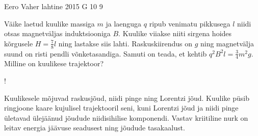 {Eero Vaher} %
{lahtine} %
{2015} %
{G 10} %
{9} %
{
\ifStatement
Väike laetud kuulike massiga $m$ ja laenguga $q$ ripub venimatu pikkusega $l$ niidi otsas magnetväljas induktsiooniga $B$. Kuulike viiakse niiti sirgena hoides kõrgusele $H=\frac{7}{8}l$ ning lastakse siis lahti. Raskuskiirendus on $g$ ning magnetvälja suund on risti pendli võnketasandiga. Samuti on teada, et kehtib $q^2B^2l=\frac{3}{4}m^2g$. Milline on kuulikese trajektoor?

\begin{center}
\begin{resizebox}{0.5\linewidth}{!}{
}
\end{resizebox}
\end{center}
\fi


\ifHint
Kuulikesele mõjuvad raskusjõud, niidi pinge ning Lorentzi jõud. Kuulike püsib ringjoone kaare kujulisel trajektooril seni, kuni Lorentzi jõud ja niidi pinge ületavad ülejäänud jõudude niidisihilise komponendi. Vastav kriitiline nurk on leitav energia jäävuse seadusest ning jõudude tasakaalust.
\fi


}
